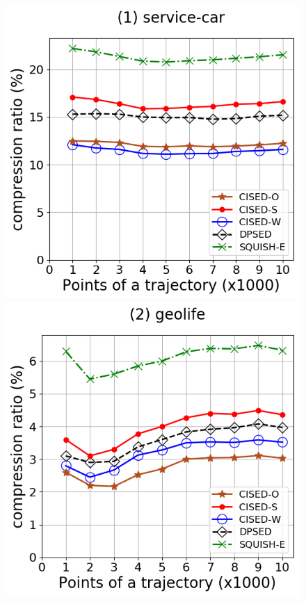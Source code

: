 \begin{figure}[tb!]
\centering
\includegraphics[scale = 0.30]{Figures/Exp-CR-size-service.png}
\includegraphics[scale = 0.30]{Figures/Exp-CR-size-geolife.png}

\end{figure}
